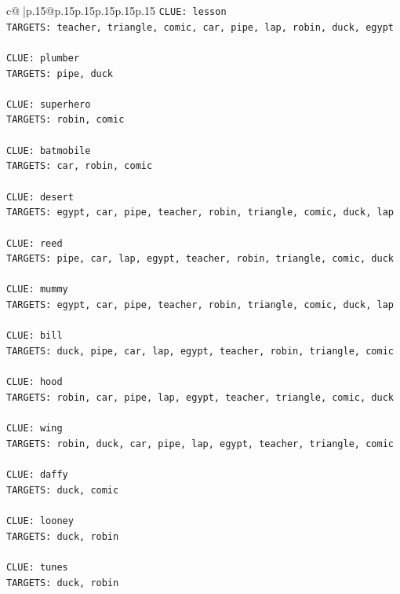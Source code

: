 \documentclass{article}
\begin{document}
{\begin{supertabular}{c@{$\;$}|p{.15\linewidth}@{}p{.15\linewidth}p{.15\linewidth}p{.15\linewidth}p{.15\linewidth}p{.15\linewidth}}
{{{\texttt{CLUE: lesson} \\
\texttt{TARGETS: teacher, triangle, comic, car, pipe, lap, robin, duck, egypt} \\
\\ 
\texttt{CLUE: plumber} \\
\texttt{TARGETS: pipe, duck} \\
\\ 
\texttt{CLUE: superhero} \\
\texttt{TARGETS: robin, comic} \\
\\ 
\texttt{CLUE: batmobile} \\
\texttt{TARGETS: car, robin, comic} \\
\\ 
\texttt{CLUE: desert} \\
\texttt{TARGETS: egypt, car, pipe, teacher, robin, triangle, comic, duck, lap} \\
\\ 
\texttt{CLUE: reed} \\
\texttt{TARGETS: pipe, car, lap, egypt, teacher, robin, triangle, comic, duck} \\
\\ 
\texttt{CLUE: mummy} \\
\texttt{TARGETS: egypt, car, pipe, teacher, robin, triangle, comic, duck, lap} \\
\\ 
\texttt{CLUE: bill} \\
\texttt{TARGETS: duck, pipe, car, lap, egypt, teacher, robin, triangle, comic} \\
\\ 
\texttt{CLUE: hood} \\
\texttt{TARGETS: robin, car, pipe, lap, egypt, teacher, triangle, comic, duck} \\
\\ 
\texttt{CLUE: wing} \\
\texttt{TARGETS: robin, duck, car, pipe, lap, egypt, teacher, triangle, comic} \\
\\ 
\texttt{CLUE: daffy} \\
\texttt{TARGETS: duck, comic} \\
\\ 
\texttt{CLUE: looney} \\
\texttt{TARGETS: duck, robin} \\
\\ 
\texttt{CLUE: tunes} \\
\texttt{TARGETS: duck, robin} \\
}}}
\end{supertabular}}
\end{document}
